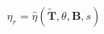 \documentclass[preview]{standalone}
\begin{document}
\begin{align*}
\eta_r = \hat{\eta}(\tilde{\mathbf{T}}, \theta, \mathbf{B}, s)
\end{align*}
\end{document}
